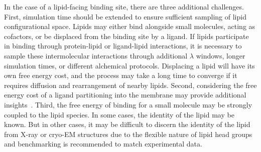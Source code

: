 \documentclass[9pt,bestpractices]{livecoms}
\begin{document}
In the case of a lipid-facing binding site, there are three additional challenges. First, simulation time should be extended to ensure sufficient sampling of lipid configurational space. Lipids may either bind alongside small molecules, acting as cofactors, or be displaced from the binding site by a ligand. If lipids participate in binding through protein-lipid or ligand-lipid interactions, it is necessary to sample these intermolecular interactions through additional $\lambda$ windows, longer simulation times, or different alchemical protocols. Displacing a lipid will have its own free energy cost, and the process may take a long time to converge if it requires diffusion and rearrangement of nearby lipids. Second, considering the free energy cost of a ligand partitioning into the membrane may provide additional insights~\cite{doi:10.1021/acs.jcim.1c01147}. Third, the free energy of binding for a small molecule may be strongly coupled to the lipid species. In some cases, the identity of the lipid may be known. But in other cases, it may be difficult to discern the identity of the lipid from X-ray or cryo-EM structures due to the flexible nature of lipid head groups and benchmarking is recommended to match experimental data.
\end{document}
